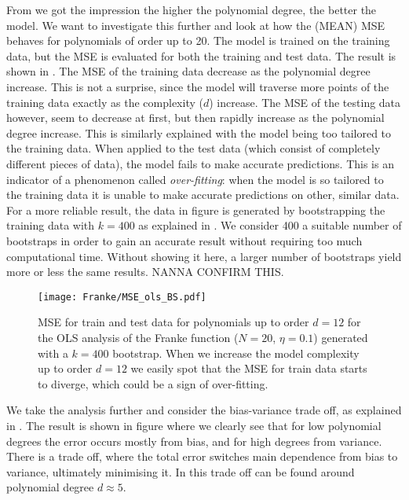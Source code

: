            From  we got the impression the higher the polynomial degree, the better the model. We want to investigate this further and look at how the (MEAN) MSE behaves for polynomials of order up to 20. The model is trained on the training data, but the MSE is evaluated for both the training and test data. The result is shown in . The MSE of the training data decrease as the polynomial degree increase. This is not a surprise, since the model will traverse more points of the training data exactly as the complexity ($d$) increase. The MSE of the testing data however, seem to decrease at first, but then rapidly increase as the polynomial degree increase. This is similarly explained with the model being too tailored to the training data. When applied to the test data (which consist of completely different pieces of data), the model fails to make accurate predictions. This is an indicator of a phenomenon called \textit{over-fitting}: when the model is so tailored to the training data it is unable to make accurate predictions on other, similar data. For a more reliable result, the data in figure  is generated by bootstrapping the training data with $k=400$ as explained in . We consider 400 a suitable number of bootstraps in order to gain an accurate result without requiring too much computational time. Without showing it here, a larger number of bootstraps yield more or less the same results. NANNA CONFIRM THIS. 

            \begin{figure}
                \texttt{[image: Franke/MSE\_ols\_BS.pdf]}
                \caption{MSE for train and test data for polynomials up to order $d=12$ for the OLS analysis of the Franke function ($N=20$, $\eta=0.1$) generated with a $k=400$ bootstrap. When we increase the model complexity  up to order $d=12$ we easily  spot that the MSE for train data starts to diverge, which could be a sign of over-fitting.}
                \label{fig:model_complexity_ols}
            \end{figure}

            We take the analysis further and consider the bias-variance trade off, as explained in . The result is shown in figure   where we clearly see that for low polynomial degrees the error occurs mostly from bias, and for high degrees from  variance. There is a trade off, where the  total error switches  main dependence from bias to variance, ultimately minimising it. In  this  trade off can be found around polynomial degree $d\approx 5$.

